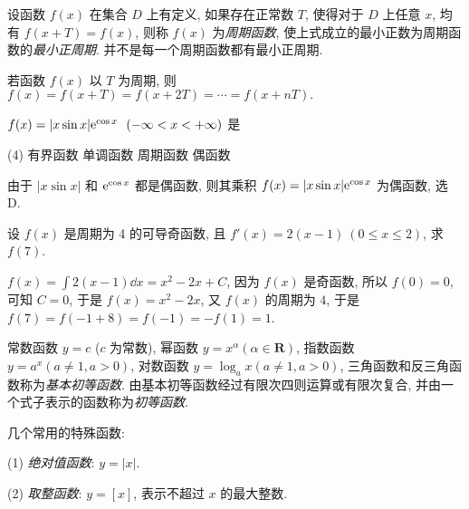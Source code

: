 \begin{definition}[周期性]
    设函数 $ f(x) $ 在集合 $ D $ 上有定义, 如果存在正常数 $ T $, 使得对于 $ D $ 上任意 $ x $, 均有 $ f(x+T)=f(x) $, 则称 $ f(x) $ 为\textit{周期函数}, 使上式成立的最小正数为周期函数的\textit{最小正周期}. 并不是每一个周期函数都有最小正周期.
\end{definition}

\begin{theorem}[函数的周期性定理]
    若函数 $f(x)$ 以 $T$ 为周期, 则 $f(x)=f(x+T)=f(x+2T)=\cdots=f(x+nT).$
\end{theorem}

\begin{example}[1987 数二]
    $f(x)=|x\sin x|\mathrm{e}^{\cos x}~~(-\infty<x<+\infty)$ 是
    \begin{tasks}(4)
        \task 有界函数
        \task 单调函数
        \task 周期函数
        \task 偶函数
    \end{tasks}
\end{example}
\begin{solution}
    由于 $|x\sin x|$ 和 $\mathrm{e}^{\cos x}$ 都是偶函数, 则其乘积 $f(x)=|x\sin x|\mathrm{e}^{\cos x}$ 为偶函数, 选 D.
\end{solution}

\begin{example}[2014 数一]
    设 $f(x)$ 是周期为 4 的可导奇函数, 且 $f'(x)=2(x-1)~ (0\leqslant x\leqslant 2)$, 求 $f(7)$.
\end{example}
\begin{solution}
    $f(x)=\displaystyle\int 2(x-1)\dd x=x^2-2x+C$, 因为 $f(x)$ 是奇函数, 所以 $f(0)=0$, 可知 $C=0$, 于是 $f(x)=x^2-2x$, 
    又 $f(x)$ 的周期为 $4$, 于是 $f(7)=f(-1+8)=f(-1)=-f(1)=1$.
\end{solution}

\begin{definition}[基本初等函数与初等函数]
    常数函数 $ y=c$ ($c $ 为常数), 幂函数 $ y=x^{\alpha}(\alpha \in \mathbf{R}) $, 指数函数 $ y=a^{x}(a \neq 1, a>0) $, 对数函数 $ y=\log _{a} x(a \neq 1, a>0) $, 三角函数和反三角函数称为\textit{基本初等函数}. 由基本初等函数经过有限次四则运算或有限次复合, 并由一个式子表示的函数称为\textit{初等函数}.
\end{definition}

几个常用的特殊函数:

(1) \textit{绝对值函数}: $ y=|x|$.

(2) \textit{取整函数}: $ y=[x] $, 表示不超过 $ x $ 的最大整数.

